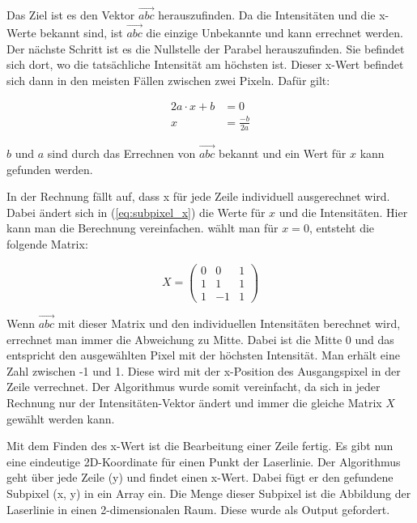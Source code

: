 	Das Ziel ist es den Vektor \( \vec{abc} \) herauszufinden. Da die Intensitäten und die x-Werte bekannt sind, ist \( \vec{abc} \) die einzige Unbekannte und kann errechnet werden. Der nächste Schritt ist es die Nullstelle der Parabel herauszufinden. Sie befindet sich dort, wo die tatsächliche Intensität am höchsten ist. Dieser x-Wert befindet sich dann in den meisten Fällen zwischen zwei Pixeln. Dafür gilt:
	
	\begin{equation}
	\begin{aligned}
	2a \cdot x + b &= 0 \\
	x &= \frac{-b}{2a}
	\end{aligned}
	\end{equation}
	
	\( b \) und \( a \) sind durch das Errechnen von \( \vec{abc} \) bekannt und ein Wert für \( x \) kann gefunden werden.
	
	In der Rechnung fällt auf, dass x für jede Zeile individuell ausgerechnet wird. Dabei ändert sich in (\ref{eq:subpixel_x}) die Werte für \( x \) und die Intensitäten. Hier kann man die Berechnung vereinfachen. wählt man für \( x = 0\), entsteht die folgende Matrix:
	
	\begin{equation}
	X = \begin{pmatrix}
	0 & 0 & 1 \\
	1 & 1 & 1 \\
	1 & -1 & 1
	\end{pmatrix}
	\end{equation}
	
	Wenn \( \vec{abc} \) mit dieser Matrix und den individuellen Intensitäten berechnet wird, errechnet man immer die Abweichung zu Mitte. Dabei ist die Mitte 0 und das entspricht den ausgewählten Pixel mit der höchsten Intensität. Man erhält eine Zahl zwischen -1 und 1. Diese wird mit der x-Position des Ausgangspixel in der Zeile verrechnet. Der Algorithmus wurde somit vereinfacht, da sich in jeder Rechnung nur der Intensitäten-Vektor ändert und immer die gleiche Matrix \( X \) gewählt werden kann.
	
	Mit dem Finden des x-Wert ist die Bearbeitung einer Zeile fertig. Es gibt nun eine eindeutige 2D-Koordinate für einen Punkt der Laserlinie. Der Algorithmus geht über jede Zeile (y) und findet einen x-Wert. Dabei fügt er den gefundene Subpixel (x, y) in ein Array ein. Die Menge dieser Subpixel ist die Abbildung der Laserlinie in einen 2-dimensionalen Raum. Diese wurde als Output gefordert.
	
